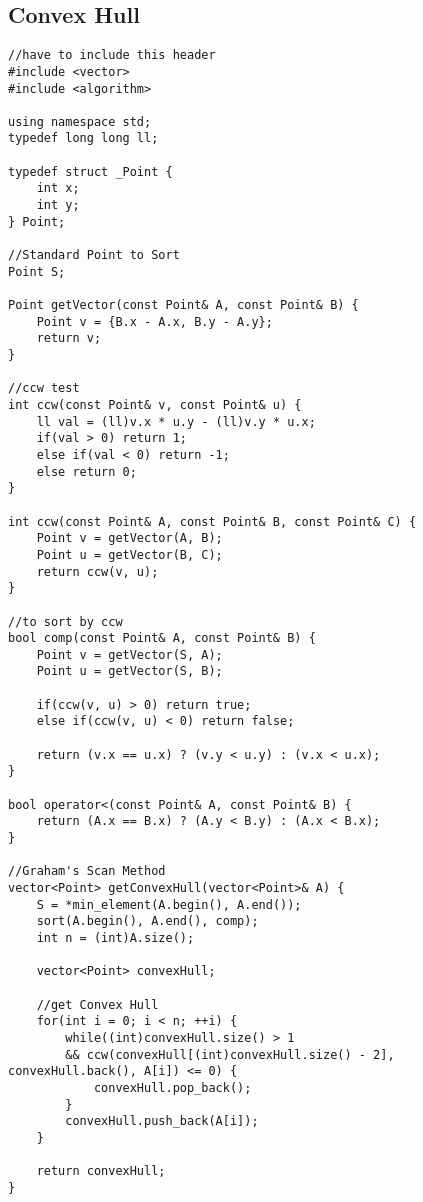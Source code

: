 \documentclass[landscape, 8pt, a4paper, oneside, twocolumn]{extarticle}
\begin{document}
\subsection{Convex Hull}
\begin{verbatim}
//have to include this header
#include <vector>
#include <algorithm>

using namespace std;
typedef long long ll;

typedef struct _Point {
    int x;
    int y;
} Point;

//Standard Point to Sort
Point S;

Point getVector(const Point& A, const Point& B) {
    Point v = {B.x - A.x, B.y - A.y};
    return v;
}

//ccw test
int ccw(const Point& v, const Point& u) {
    ll val = (ll)v.x * u.y - (ll)v.y * u.x; 
    if(val > 0) return 1;
    else if(val < 0) return -1;
    else return 0;
}

int ccw(const Point& A, const Point& B, const Point& C) {
    Point v = getVector(A, B);
    Point u = getVector(B, C);
    return ccw(v, u);
}

//to sort by ccw
bool comp(const Point& A, const Point& B) {
    Point v = getVector(S, A);
    Point u = getVector(S, B);

    if(ccw(v, u) > 0) return true;
    else if(ccw(v, u) < 0) return false;

    return (v.x == u.x) ? (v.y < u.y) : (v.x < u.x);
}

bool operator<(const Point& A, const Point& B) {
    return (A.x == B.x) ? (A.y < B.y) : (A.x < B.x);
}

//Graham's Scan Method
vector<Point> getConvexHull(vector<Point>& A) {
    S = *min_element(A.begin(), A.end());
    sort(A.begin(), A.end(), comp);
    int n = (int)A.size();

    vector<Point> convexHull;

    //get Convex Hull
    for(int i = 0; i < n; ++i) {
        while((int)convexHull.size() > 1 
        && ccw(convexHull[(int)convexHull.size() - 2], convexHull.back(), A[i]) <= 0) {
            convexHull.pop_back();
        }
        convexHull.push_back(A[i]);
    }
    
    return convexHull;
}
\end{verbatim}
\end{document}
